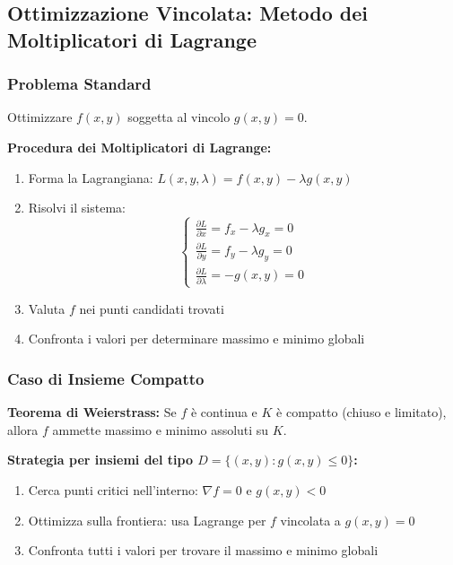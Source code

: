 \subsection{Ottimizzazione Vincolata: Metodo dei Moltiplicatori di Lagrange}

\subsubsection{Problema Standard}
Ottimizzare $f(x,y)$ soggetta al vincolo $g(x,y) = 0$.

\begin{strategia}
\textbf{Procedura dei Moltiplicatori di Lagrange:}
\begin{enumerate}
    \item Forma la Lagrangiana: $L(x,y,\lambda) = f(x,y) - \lambda g(x,y)$
    \item Risolvi il sistema:
    \[ \begin{cases} 
    \frac{\partial L}{\partial x} = f_x - \lambda g_x = 0 \\
    \frac{\partial L}{\partial y} = f_y - \lambda g_y = 0 \\
    \frac{\partial L}{\partial \lambda} = -g(x,y) = 0
    \end{cases} \]
    \item Valuta $f$ nei punti candidati trovati
    \item Confronta i valori per determinare massimo e minimo globali
\end{enumerate}
\end{strategia}

\subsubsection{Caso di Insieme Compatto}

\begin{info}
\textbf{Teorema di Weierstrass:} Se $f$ è continua e $K$ è compatto (chiuso e limitato), allora $f$ ammette massimo e minimo assoluti su $K$.

\textbf{Strategia per insiemi del tipo $D = \{(x,y) : g(x,y) \leq 0\}$:}
\begin{enumerate}
    \item Cerca punti critici nell'interno: $\nabla f = 0$ e $g(x,y) < 0$
    \item Ottimizza sulla frontiera: usa Lagrange per $f$ vincolata a $g(x,y) = 0$
    \item Confronta tutti i valori per trovare il massimo e minimo globali
\end{enumerate}
\end{info}

